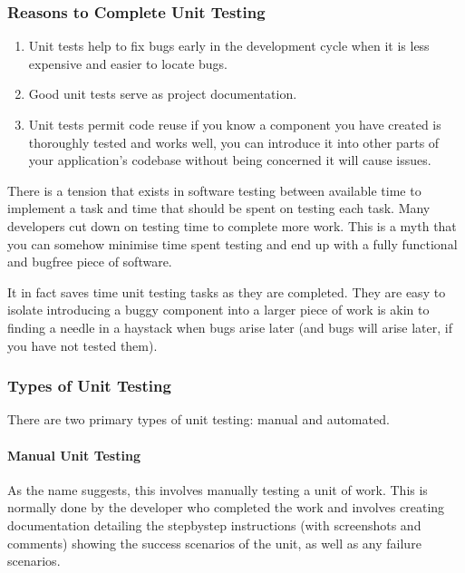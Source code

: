 \documentclass[letterpaper,10pt,english]{jupyterBook}
\begin{document}
\subsubsection{Reasons to Complete Unit Testing}
\label{\detokenize{chapter_13/testing:reasons-to-complete-unit-testing}}\begin{enumerate}
%
\item {} 
\sphinxAtStartPar
Unit tests help to fix bugs early in the development cycle when it
is less expensive and easier to locate bugs.

\item {} 
\sphinxAtStartPar
Good unit tests serve as project documentation.

\item {} 
\sphinxAtStartPar
Unit tests permit code re\sphinxhyphen{}use \sphinxhyphen{} if you know a component you have
created is thoroughly tested and works well, you can introduce it
into other parts of your application’s codebase without being
concerned it will cause issues.

\end{enumerate}

\sphinxAtStartPar
There is a tension that exists in software testing between available
time to implement a task and time that should be spent on testing each
task. Many developers cut down on testing time to complete more work.
This is a myth that you can somehow minimise time spent testing and end
up with a fully functional and bug\sphinxhyphen{}free piece of software.

\sphinxAtStartPar
It in fact saves time unit testing tasks as they are completed. They are
easy to isolate \sphinxhyphen{} introducing a buggy component into a larger piece of
work is akin to finding a needle in a haystack when bugs arise later
(and bugs will arise later, if you have not tested them).


\subsubsection{Types of Unit Testing}
\label{\detokenize{chapter_13/testing:types-of-unit-testing}}
\sphinxAtStartPar
There are two primary types of unit testing: manual and automated.


\paragraph{Manual Unit Testing}
\label{\detokenize{chapter_13/testing:manual-unit-testing}}
\sphinxAtStartPar
As the name suggests, this involves manually testing a unit of work.
This is normally done by the developer who completed the work and
involves creating documentation detailing the step\sphinxhyphen{}by\sphinxhyphen{}step instructions
(with screenshots and comments) showing the success scenarios of the
unit, as well as any failure scenarios.
\end{document}
